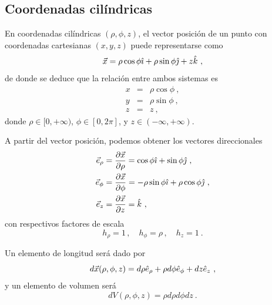 \subsection{Coordenadas cilíndricas}

En coordenadas cilíndricas $(\rho, \phi, z)$, el vector posición de un punto con coordenadas cartesianas $(x,y,z)$ puede representarse como 
\begin{equation}
    \vec{x} = \rho \cos \phi \hat{\imath} + \rho \sin \phi \hat{\jmath} + z \hat{k} \ ,
\end{equation}
de donde se deduce que la relación entre ambos sistemas es 
\begin{equation}
    \begin{array}{rcl}
        x & = & \rho \cos \phi \ , \\
        y & = & \rho \sin \phi \ , \\
        z & = & z \ ,
    \end{array}
\end{equation} 
donde $\rho \in [0, +\infty)$, $\phi \in [0, 2\pi]$, y $z \in (-\infty, +\infty)$.

A partir del vector posición, podemos obtener los vectores direccionales 
\begin{align}
    \vec{e}_\rho & = \frac{\partial \vec{x}}{\partial \rho} = \cos \phi \hat{\imath} + \sin \phi \hat{\jmath} \ , \\
    \vec{e}_\phi & = \frac{\partial \vec{x}}{\partial \phi} = -\rho \sin \phi  \hat{\imath} + \rho \cos \phi \hat{\jmath} \ , \\
    \vec{e}_z & = \frac{\partial \vec{x}}{\partial z} = \hat{k} \ ,
\end{align}
con respectivos factores de escala 
\begin{equation}
    h_\rho = 1 \, , \quad h_\phi = \rho \, , \quad h_z = 1 \ .
\end{equation}

Un elemento de longitud será dado por 
\begin{equation}
    d\vec{x}(\rho, \phi, z) = d\rho \hat{e}_\rho + \rho d\phi \hat{e}_\phi + dz \hat{e}_z \ ,
\end{equation}
y un elemento de volumen será
\begin{equation}
    dV(\rho, \phi, z) = \rho d\rho d\phi dz \ .
\end{equation}

